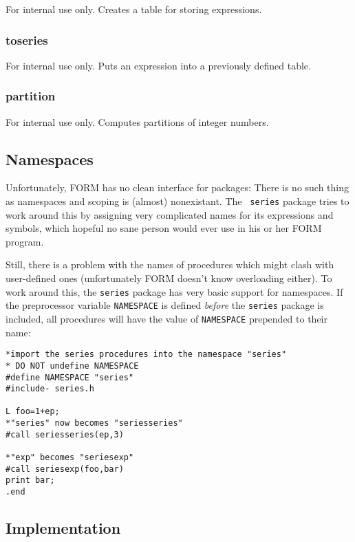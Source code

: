 \documentclass{article}
\begin{document}
For internal use only. Creates a table for storing expressions.

\subsubsection{toseries}
\label{sec:toseries}

For internal use only. Puts an expression into a previously defined table.

\subsubsection{partition}
\label{sec:toseries}

For internal use only. Computes partitions of integer numbers.

\subsection{Namespaces}
\label{sec:namesp}

Unfortunately, FORM has no clean interface for packages: There is no
such thing as namespaces and scoping is (almost) nonexistant. The {\tt
  series} package tries to work around this by assigning very complicated
names for its expressions and symbols, which hopeful no sane person
would ever use in his or her FORM program.

Still, there is a problem with the names of procedures which might clash
with user-defined ones (unfortunately FORM doesn't know overloading
either). To work around this, the {\tt series} package has very basic
support for namespaces. If the preprocessor variable {\tt NAMESPACE} is
defined {\em before} the {\tt series} package is included, all
procedures will have the value of {\tt NAMESPACE} prepended to their name:
\begin{verbatim}
*import the series procedures into the namespace "series"
* DO NOT undefine NAMESPACE
#define NAMESPACE "series"
#include- series.h

L foo=1+ep;
*"series" now becomes "seriesseries"
#call seriesseries(ep,3)

*"exp" becomes "seriesexp"
#call seriesexp(foo,bar)
print bar;
.end
\end{verbatim}

\subsection{Implementation}
\label{sec:impl}
\end{document}
